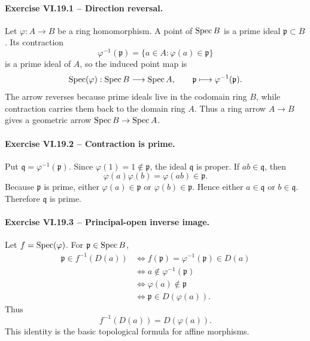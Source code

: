 
\paragraph{Exercise VI.19.1 -- Direction reversal.}
\begin{solution}
Let \(\varphi:A\to B\) be a ring homomorphism.  A point of \(\operatorname{Spec} B\) is a prime ideal \(\mathfrak p\subset B\).  Its contraction
\[
\varphi^{-1}(\mathfrak p)=\{a\in A:\varphi(a)\in\mathfrak p\}
\]
is a prime ideal of \(A\), so the induced point map is
\[
\operatorname{Spec}(\varphi):\operatorname{Spec} B\longrightarrow\operatorname{Spec} A,
\qquad
\mathfrak p\longmapsto\varphi^{-1}(\mathfrak p).
\]
The arrow reverses because prime ideals live in the codomain ring \(B\), while contraction carries them back to the domain ring \(A\).  Thus a ring arrow \(A\to B\) gives a geometric arrow \(\operatorname{Spec} B\to\operatorname{Spec} A\).
\end{solution}

\paragraph{Exercise VI.19.2 -- Contraction is prime.}
\begin{solution}
Put \(\mathfrak q=\varphi^{-1}(\mathfrak p)\).  Since \(\varphi(1)=1\notin\mathfrak p\), the ideal \(\mathfrak q\) is proper.  If \(ab\in\mathfrak q\), then
\[
\varphi(a)\varphi(b)=\varphi(ab)\in\mathfrak p.
\]
Because \(\mathfrak p\) is prime, either \(\varphi(a)\in\mathfrak p\) or \(\varphi(b)\in\mathfrak p\).  Hence either \(a\in\mathfrak q\) or \(b\in\mathfrak q\).  Therefore \(\mathfrak q\) is prime.
\end{solution}

\paragraph{Exercise VI.19.3 -- Principal-open inverse image.}
\begin{solution}
Let \(f=\operatorname{Spec}(\varphi)\).  For \(\mathfrak p\in\operatorname{Spec} B\),
\[
\begin{aligned}
\mathfrak p\in f^{-1}(D(a))
&\iff f(\mathfrak p)=\varphi^{-1}(\mathfrak p)\in D(a)\\
&\iff a\notin\varphi^{-1}(\mathfrak p)\\
&\iff \varphi(a)\notin\mathfrak p\\
&\iff \mathfrak p\in D(\varphi(a)).
\end{aligned}
\]
Thus
\[
\boxed{f^{-1}(D(a))=D(\varphi(a)).}
\]
This identity is the basic topological formula for affine morphisms.
\end{solution}

